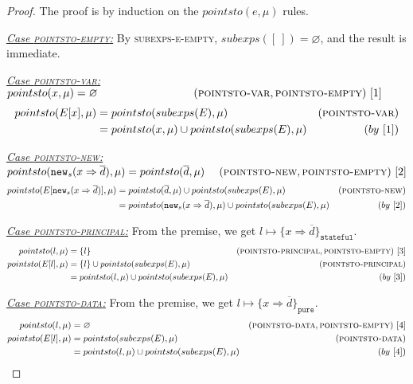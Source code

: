 \documentclass{llncs}
\newcommand{\keywadj}[1]{\mathtt{#1}}
\begin{document}
\begin{proof} The proof is by induction on the $pointsto(e, \mu)$ rules.

\noindent\underline{\textit{Case \textsc{pointsto-empty}:}} By \textsc{subexps-e-empty}, $subexps([~]) = \varnothing$, and the result is immediate.

\noindent\underline{\textit{Case \textsc{pointsto-var}:}} $pointsto(x, \mu) = \varnothing~~~~~~~~~~~~~~~~~~~~~~~~~~(\textsc{pointsto-var}, \textsc{pointsto-empty})~[1]$
\vspace{-7pt}
\begin{align*}
pointsto(E[x], \mu) &= pointsto(subexps(E), \mu) & (\textsc{pointsto-var})\\
&= pointsto(x, \mu) \cup pointsto(subexps(E), \mu) & (by~[1])
\end{align*}

\noindent\underline{\textit{Case \textsc{pointsto-new}:}} $pointsto(\keywadj{new}_s(x \Rightarrow \overline{d}), \mu) = pointsto(\overline{d}, \mu)~~~~(\textsc{pointsto-new}, \textsc{pointsto-empty})~[2]$
\vspace{-7pt}
\begin{align*}
pointsto(E[\keywadj{new}_s(x \Rightarrow \overline{d})], \mu) &= pointsto(\overline{d}, \mu) \cup pointsto(subexps(E), \mu) & (\textsc{pointsto-new})\\
&= pointsto(\keywadj{new}_s(x \Rightarrow \overline{d}), \mu) \cup pointsto(subexps(E), \mu) & (by~[2])
\end{align*}

\noindent\underline{\textit{Case \textsc{pointsto-principal}:}} From the premise, we get $l \mapsto \{ x \Rightarrow \overline{d} \}_{\keywadj{stateful}}$.
\vspace{-7pt}
\begin{align*}
pointsto(l, \mu) &= \{ l \} & (\textsc{pointsto-principal}, \textsc{pointsto-empty})~[3]\\
pointsto(E[l], \mu) &= \{ l \} \cup pointsto(subexps(E), \mu) & (\textsc{pointsto-principal})\\
&= pointsto(l, \mu) \cup pointsto(subexps(E), \mu) & (by~[3])
\end{align*}

\noindent\underline{\textit{Case \textsc{pointsto-data}:}} From the premise, we get $l \mapsto \{ x \Rightarrow \overline{d} \}_{\keywadj{pure}}$.
\vspace{-7pt}
\begin{align*}
pointsto(l, \mu) &= \varnothing & (\textsc{pointsto-data}, \textsc{pointsto-empty})~[4]\\
pointsto(E[l], \mu) &= pointsto(subexps(E), \mu) & (\textsc{pointsto-data})\\
&= pointsto(l, \mu) \cup pointsto(subexps(E), \mu) & (by~[4])
\end{align*}


\end{proof}
\end{document}
